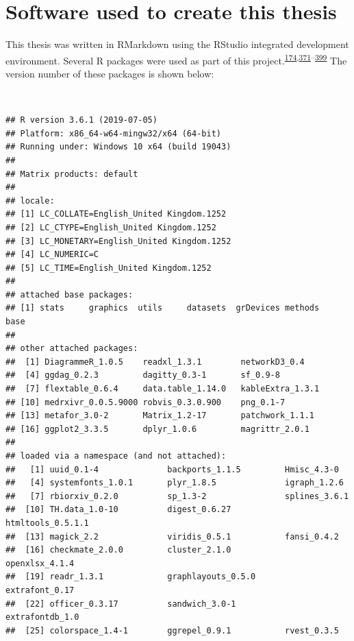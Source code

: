 \documentclass[a4paper, twoside]{templates/ociamthesis}
\begin{document}
\minitoc 

\newpage

\hypertarget{software-used-to-create-this-thesis}{%
\section{Software used to create this thesis}\label{software-used-to-create-this-thesis}}

This thesis was written in RMarkdown using the RStudio integrated development environment. Several R packages were used as part of this project.\textsuperscript{\protect\hyperlink{ref-R-metafor}{174},\protect\hyperlink{ref-R-base}{371}--\protect\hyperlink{ref-sf2018}{399}} The version number of these packages is shown below:

~

\begin{verbatim}
## R version 3.6.1 (2019-07-05)
## Platform: x86_64-w64-mingw32/x64 (64-bit)
## Running under: Windows 10 x64 (build 19043)
## 
## Matrix products: default
## 
## locale:
## [1] LC_COLLATE=English_United Kingdom.1252 
## [2] LC_CTYPE=English_United Kingdom.1252   
## [3] LC_MONETARY=English_United Kingdom.1252
## [4] LC_NUMERIC=C                           
## [5] LC_TIME=English_United Kingdom.1252    
## 
## attached base packages:
## [1] stats     graphics  utils     datasets  grDevices methods   base     
## 
## other attached packages:
##  [1] DiagrammeR_1.0.5    readxl_1.3.1        networkD3_0.4      
##  [4] ggdag_0.2.3         dagitty_0.3-1       sf_0.9-8           
##  [7] flextable_0.6.4     data.table_1.14.0   kableExtra_1.3.1   
## [10] medrxivr_0.0.5.9000 robvis_0.3.0.900    png_0.1-7          
## [13] metafor_3.0-2       Matrix_1.2-17       patchwork_1.1.1    
## [16] ggplot2_3.3.5       dplyr_1.0.6         magrittr_2.0.1     
## 
## loaded via a namespace (and not attached):
##   [1] uuid_0.1-4              backports_1.1.5         Hmisc_4.3-0            
##   [4] systemfonts_1.0.1       plyr_1.8.5              igraph_1.2.6           
##   [7] rbiorxiv_0.2.0          sp_1.3-2                splines_3.6.1          
##  [10] TH.data_1.0-10          digest_0.6.27           htmltools_0.5.1.1      
##  [13] magick_2.2              viridis_0.5.1           fansi_0.4.2            
##  [16] checkmate_2.0.0         cluster_2.1.0           openxlsx_4.1.4         
##  [19] readr_1.3.1             graphlayouts_0.5.0      extrafont_0.17         
##  [22] officer_0.3.17          sandwich_3.0-1          extrafontdb_1.0        
##  [25] colorspace_1.4-1        ggrepel_0.9.1           rvest_0.3.5            

\end{verbatim}
\end{document}

